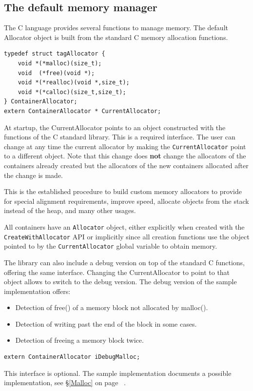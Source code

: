 \documentclass[12pt,a4paper]{memoir} %
\newcommand{\See}[1]{%
see \S\ref{#1} on page~\pageref{#1}
}
\begin{document}
\subsection{The default memory manager}
The C language provides several functions to manage memory. The default Allocator object is built from the standard C memory allocation functions.
\begin{verbatim}
typedef struct tagAllocator {
    void *(*malloc)(size_t);
    void  (*free)(void *);
    void *(*realloc)(void *,size_t);
    void *(*calloc)(size_t,size_t);
} ContainerAllocator;
extern ContainerAllocator * CurrentAllocator;
\end{verbatim}
At startup, the CurrentAllocator points to an object constructed with the functions of the C standard library. This is a required interface.
The user can change at any time the current allocator by making the \verb,CurrentAllocator, point to a different object. Note that this change
does \textbf{not} change the allocators of the containers already created but the allocators of the new containers allocated after the
change is made.

This is the established procedure to build custom memory allocators to provide for special alignment requirements, improve speed, allocate objects
from the stack instead of the heap, and many other usages.

All containers have an \verb,Allocator, object, either explicitly when created with the \verb,CreateWithAllocator, API or implicitly since all 
creation functions use the object pointed to by the \verb,CurrentAllocator, global variable to obtain memory.

The library can also include a debug version on top of the standard C functions, offering the same interface. Changing the CurrentAllocator to point to that object allows to switch to the debug version. The debug version of the sample implementation offers:
\begin{itemize}
\item
Detection of free() of a memory block not allocated by malloc().
\item
Detection of  writing past the end of the block in some cases.
\item
Detection of freeing a memory block twice.
\end{itemize}
\begin{verbatim}
extern ContainerAllocator iDebugMalloc;
\end{verbatim}
This interface is optional. The sample implementation documents a possible implementation, \See{Malloc}.
\end{document}
